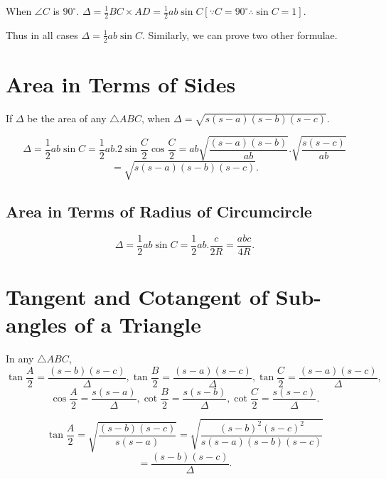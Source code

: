  When $\angle C$ is $90^\circ$.
$\Delta = \frac{1}{2}BC\times AD = \frac{1}{2}ab\sin C[\because C=90^\circ \therefore \sin C = 1]$.

\noindent Thus in all cases $\Delta = \frac{1}{2}ab\sin C$. Similarly, we can prove two other formulae.
\stopproof

\section{Area in Terms of Sides}
\starttheorem
  If $\Delta$ be the area of any $\triangle ABC$, when $\Delta = \sqrt{s(s - a)(s - b)(s - c)}$.
\stoptheorem

\startproof
  $$\Delta = \frac{1}{2}ab\sin C = \frac{1}{2}ab.2\sin\frac{C}{2}\cos\frac{C}{2} = ab\sqrt{\frac{(s - a)(s -
      b)}{ab}}.\sqrt{\frac{s(s - c)}{ab}}$$
  $$= \sqrt{s(s - a)(s - b)(s - c)}.$$

\stopproof

\subsection{Area in Terms of Radius of Circumcircle}
$$\Delta = \frac{1}{2}ab\sin C = \frac{1}{2}ab.\frac{c}{2R} = \frac{abc}{4R}.$$

\section{Tangent and Cotangent of Sub-angles of a Triangle}
\starttheorem
  In any $\triangle ABC$,
  $$\tan\frac{A}{2} = \frac{(s - b)(s - c)}{\Delta}, \tan\frac{B}{2} = \frac{(s - a)(s - c)}{\Delta}, \tan\frac{C}{2} = \frac{(s -
    a)(s - c)}{\Delta},$$
  $$\cos\frac{A}{2} = \frac{s(s - a)}{\Delta}, \cot\frac{B}{2} = \frac{s(s - b)}{\Delta}, \cot\frac{C}{2} = \frac{s(s -
    c)}{\Delta}.$$
\stoptheorem

\startproof
  $$\tan\frac{A}{2} = \sqrt{\frac{(s - b)(s - c)}{s(s - a)}} = \sqrt{\frac{(s - b)^2(s - c)^2}{s(s - a)(s - b)(s - c)}}$$
  $$= \frac{(s - b)(s - c)}{\Delta}.$$

